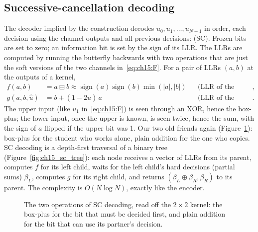 \subsection{Successive-cancellation decoding}

The decoder implied by the construction decodes $u_0,u_1,\dots,u_{N-1}$ in order, each decision
using the channel outputs and all previous decisions:  (SC). Frozen
bits are set to zero; an information bit is set by the sign of its LLR. The LLRs are computed by
running the butterfly backwards with two operations that are just the soft versions of the two
channels in~\eqref{eq:ch15:F}. For a pair of LLRs $(a,b)$ at the outputs of a kernel,
\begin{align}
f(a,b)&=a\boxplus b\approx\operatorname{sign}(a)\operatorname{sign}(b)\min(|a|,|b|)
&&\text{(LLR of the upper input, through the XOR)},\nonumber\\
g(a,b,\hat u)&=b+(1-2\hat u)\,a&&\text{(LLR of the lower input, given the upper)}.
\label{eq:ch15:fg}
\end{align}
The upper input (like $u_1$ in~\eqref{eq:ch15:F}) is seen through an XOR, hence the box-plus;
the lower input, once the upper is known, is seen twice, hence the sum, with the sign of $a$
flipped if the upper bit was 1. Our two old friends again (Figure~\ref{fig:ch15_fg}): box-plus for the student who works
alone, plain addition for the one who copies. SC decoding is a depth-first traversal of a binary
tree (Figure~\ref{fig:ch15_sc_tree}): each node receives a vector of LLRs from its parent, computes
$f$ for its left child, waits for the left child's hard decisions (partial sums) $\beta_L$, computes
$g$ for its right child, and returns $(\beta_L\oplus\beta_R,\beta_R)$ to its parent. The complexity
is $O(N\log N)$, exactly like the encoder.

\begin{figure}[H]\centering
{}
\caption{The two operations of SC decoding, read off the $2\times2$ kernel: the box-plus for the
bit that must be decided first, and plain addition for the bit that can use its partner's decision.}
\label{fig:ch15_fg}\end{figure}

